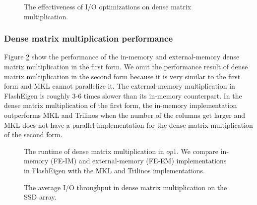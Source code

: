 \begin{figure}
	\begin{center}
		\footnotesize
		
		\caption{The effectiveness of I/O optimizations on dense matrix
		multiplication.}
		\label{perf:dmm_opts}
	\end{center}
\end{figure}

\subsubsection{Dense matrix multiplication performance}

Figure \ref{perf:gemm} show the performance of the in-memory and external-memory
dense matrix multiplication in the first form. We omit the performance result
of dense matrix multiplication in the second form because it is very similar
to the first form and MKL cannot parallelize it.
The external-memory multiplication in FlashEigen is roughly 3-6 times slower
than its in-memory counterpart. In the dense matrix multiplication of
the first form, the in-memory implementation outperforms MKL and Trilinos
when the number of the columns get larger and MKL does not have a parallel
implementation for the dense matrix multiplication of the second form.

\begin{figure}
	\begin{center}
		\footnotesize
		
		\caption{The runtime of dense matrix multiplication in $op1$. We compare
			in-memory (FE-IM) and external-memory (FE-EM) implementations
			in FlashEigen with the MKL and Trilinos implementations.}
		\label{perf:gemm}
	\end{center}
\end{figure}

%		

\begin{figure}
	\begin{center}
		\footnotesize
		
		\caption{The average I/O throughput in dense matrix multiplication
		on the SSD array.}
		\label{perf:dmm_io}
	\end{center}
\end{figure}

